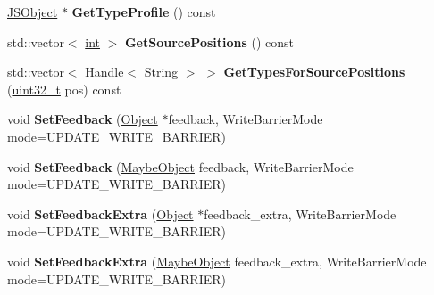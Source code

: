 \begin{DoxyCompactItemize}
\item 
\mbox{\label{classv8_1_1internal_1_1FeedbackNexus_a5b987d7fc9f47c744b8d5182b59dc47e}} 
\mbox{\hyperlink{classv8_1_1internal_1_1JSObject}{J\+S\+Object}} $\ast$ {\bfseries Get\+Type\+Profile} () const
\item 
\mbox{\label{classv8_1_1internal_1_1FeedbackNexus_a5abc627bd0fcaa8ace13a4e7b72f0e22}} 
std\+::vector$<$ \mbox{\hyperlink{classint}{int}} $>$ {\bfseries Get\+Source\+Positions} () const
\item 
\mbox{\label{classv8_1_1internal_1_1FeedbackNexus_ae26d5e942c63a10b6d8408623e5bd471}} 
std\+::vector$<$ \mbox{\hyperlink{classv8_1_1internal_1_1Handle}{Handle}}$<$ \mbox{\hyperlink{classv8_1_1internal_1_1String}{String}} $>$ $>$ {\bfseries Get\+Types\+For\+Source\+Positions} (\mbox{\hyperlink{classuint32__t}{uint32\+\_\+t}} pos) const
\item 
\mbox{\label{classv8_1_1internal_1_1FeedbackNexus_a05374b1926bb62b14dfa93770de242f8}} 
void {\bfseries Set\+Feedback} (\mbox{\hyperlink{classv8_1_1internal_1_1Object}{Object}} $\ast$feedback, Write\+Barrier\+Mode mode=U\+P\+D\+A\+T\+E\+\_\+\+W\+R\+I\+T\+E\+\_\+\+B\+A\+R\+R\+I\+ER)
\item 
\mbox{\label{classv8_1_1internal_1_1FeedbackNexus_aea745c580da02102dd421487a2d20893}} 
void {\bfseries Set\+Feedback} (\mbox{\hyperlink{classv8_1_1internal_1_1MaybeObject}{Maybe\+Object}} feedback, Write\+Barrier\+Mode mode=U\+P\+D\+A\+T\+E\+\_\+\+W\+R\+I\+T\+E\+\_\+\+B\+A\+R\+R\+I\+ER)
\item 
\mbox{\label{classv8_1_1internal_1_1FeedbackNexus_aede01d24ca8298dfc4b8b4aaafbef723}} 
void {\bfseries Set\+Feedback\+Extra} (\mbox{\hyperlink{classv8_1_1internal_1_1Object}{Object}} $\ast$feedback\+\_\+extra, Write\+Barrier\+Mode mode=U\+P\+D\+A\+T\+E\+\_\+\+W\+R\+I\+T\+E\+\_\+\+B\+A\+R\+R\+I\+ER)
\item 
\mbox{\label{classv8_1_1internal_1_1FeedbackNexus_a527054e76ab463c2c9f42f0f086063cf}} 
void {\bfseries Set\+Feedback\+Extra} (\mbox{\hyperlink{classv8_1_1internal_1_1MaybeObject}{Maybe\+Object}} feedback\+\_\+extra, Write\+Barrier\+Mode mode=U\+P\+D\+A\+T\+E\+\_\+\+W\+R\+I\+T\+E\+\_\+\+B\+A\+R\+R\+I\+ER)

\end{DoxyCompactItemize}
